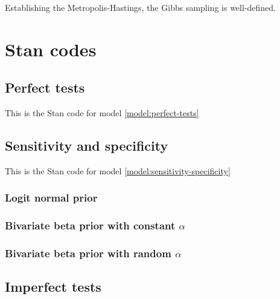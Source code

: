 Establishing the Metropolis-Hastings, the Gibbs sampling is well-defined.

\chapter{Stan codes}
\label{appendix:stan-codes}

\section{Perfect tests}

This is the Stan code for model \eqref{model:perfect-tests}



\section{Sensitivity and specificity}

This is the Stan code for model \eqref{model:sensitivity-specificity}

\subsection*{Logit normal prior}



\subsection*{Bivariate beta prior with constant $\alpha$}



\subsection*{Bivariate beta prior with random $\alpha$}



\section{Imperfect tests}


